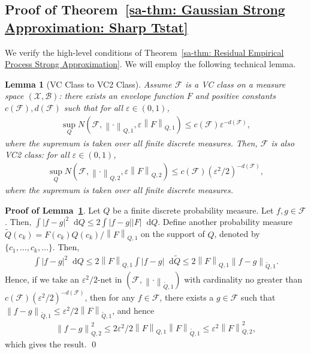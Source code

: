 \documentclass[10pt]{article}
\newtheorem{lem}{Lemma}
\newcommand{\dif}{\mathop{}\!\mathrm{d}}
\newcommand{\norm}[1]{\left\lVert#1\right\rVert}
\newcommand{\F}{\mathcal{F}}
\newcommand{\X}{\mathcal{X}}
\begin{document}
\subsection{Proof of Theorem~\ref{sa-thm: Gaussian Strong Approximation: Sharp Tstat}}

We verify the high-level conditions of Theorem~\ref{sa-thm: Residual Empirical Process Strong Approximation}. We will employ the following technical lemma.

\begin{lem}[VC Class to VC2 Class]\label{sa-lem: VC Class to VC2 Class}
    Assume $\F$ is a VC class on a measure space $(\X, \mathcal{B})$: there exists an envelope function $F$ and positive constants $c(\F), d(\F)$ such that for all $\varepsilon\in(0,1)$,
    \begin{align*}
        \sup_{Q}N(\mathcal{F}, \norm{\cdot}_{Q,1}, \varepsilon \norm{F}_{Q,1}) \leq c(\F)\varepsilon^{-d(\F)},
    \end{align*}
    where the supremum is taken over all finite discrete measures. Then, $\F$ is also VC2 class: for all $\varepsilon\in(0,1)$,
    \begin{align*}
        \sup_{Q} N(\mathcal{F}, \norm{\cdot}_{Q,2}, \varepsilon \norm{F}_{Q,2}) \leq c(\F) (\varepsilon^2/2)^{-d(\mathcal{F})},
    \end{align*}
    where the supremum is taken over all finite discrete measures.
\end{lem}

\noindent\textbf{Proof of Lemma~\ref{sa-lem: VC Class to VC2 Class}}. Let $Q$ be a finite discrete probability measure. Let $f,g \in \mathcal{F}$. Then, $\int |f - g|^2 \dif Q \leq 2 \int |f - g| |F| \dif Q$. Define another probability measure $\tilde{Q}(c_k) = F(c_k) Q(c_k) / \norm{F}_{Q,1}$ on the support of $Q$, denoted by $\{c_1, \ldots, c_k, \ldots\}$. Then,
\begin{align*}
    \int |f - g|^2 \dif Q
    \leq 2 \norm{F}_{Q,1} \int |f - g| \dif \tilde{Q}
    \leq 2 \norm{F}_{Q,1} \norm{f - g}_{\tilde{Q},1}.
\end{align*}
Hence, if we take an $\varepsilon^2/2$-net in $(\mathcal{F}, \norm{\cdot}_{\tilde{Q},1})$ with cardinality no greater than $c(\mathcal{F})(\varepsilon^2/2)^{- d (\mathcal{F})}$, then for any $f \in \mathcal{F}$, there exists a $g \in \mathcal{F}$ such that $\norm{f - g}_{\tilde{Q},1} \leq \varepsilon^2/2 \norm{F}_{\tilde{Q},1}$, and hence
\begin{align*}
    \norm{f - g}_{Q,2}^2 \leq 2 \varepsilon^2/2 \norm{F}_{Q,1} \norm{F}_{\tilde{Q},1} \leq \varepsilon^2 \norm{F}_{Q,2}^2,
\end{align*}
which gives the result.
\qed
\end{document}
